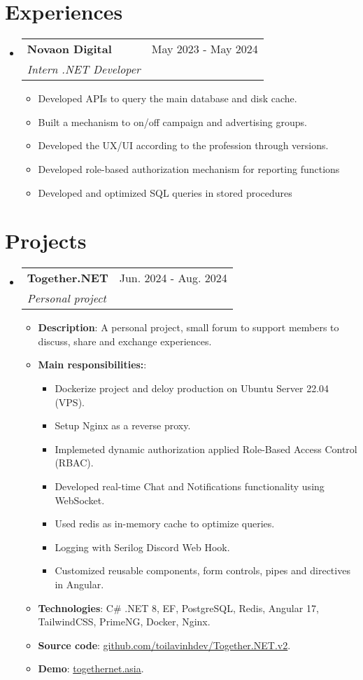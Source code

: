 \documentclass[letterpaper,11pt]{article}
\makeatletter
\newcommand{\resumeItem}[1]{
  \item\small{
    {#1 \vspace{-2pt}}
  }
}
\newcommand{\resumeSubheading}[4]{
  \vspace{-2pt}
  \item
    \begin{tabular*}{0.97\textwidth}[t]{l@{\extracolsep{\fill}}r}
      \textbf{#1} & #2 \\
      \textit{\small#3} & \textit{\small #4} \\
    \end{tabular*}
    \vspace{-7pt}
}
\newcommand{\resumeSubHeadingListStart} {
    \begin{itemize}[leftmargin=0.15in, label={}]
}
\newcommand{\resumeSubHeadingListEnd} {
    \end{itemize}
}
\newcommand{\resumeItemListStart} {
    \begin{itemize}
}
\newcommand{\resumeItemListEnd} {
    \end{itemize} 
    \vspace{-5pt}
}
\makeatother
\begin{document}
    \section{Experiences}
        \resumeSubHeadingListStart
            \resumeSubheading {Novaon Digital} {May 2023 - May 2024} {Intern .NET Developer} {}
            \resumeItemListStart
                \resumeItem{Developed APIs to query the main database and disk cache.}
                \resumeItem{Built a mechanism to on/off campaign and advertising groups.}
                \resumeItem{Developed the UX/UI according to the profession through versions.}
                \resumeItem{Developed role-based authorization mechanism for reporting functions}
                \resumeItem{Developed and optimized SQL queries in stored procedures}
            \resumeItemListEnd
        \resumeSubHeadingListEnd
        
    \section{Projects}
        \resumeSubHeadingListStart
            \resumeSubheading {Together.NET} {Jun. 2024 - Aug. 2024} {Personal project} {}
            \resumeItemListStart
                \resumeItem{\textbf{Description}: A personal project,  small forum to support members to discuss, share and exchange experiences.}
                \resumeItem{\textbf{Main responsibilities:}:}
                \resumeItemListStart
                    \resumeItem{Dockerize project and deloy production on Ubuntu Server 22.04 (VPS).}
                    \resumeItem{Setup Nginx as a reverse proxy.}
                    \resumeItem{Implemeted dynamic authorization applied Role-Based Access Control (RBAC).}
                    \resumeItem{Developed real-time Chat and Notifications functionality using WebSocket.}
                    \resumeItem{Used redis as in-memory cache to optimize queries.}
                    \resumeItem{Logging with Serilog Discord Web Hook.}
                    \resumeItem{Customized reusable components, form controls, pipes and directives in Angular.}
                \resumeItemListEnd
                \vspace{0.2cm}
                \resumeItem{\textbf{Technologies}: C\# .NET 8, EF, PostgreSQL, Redis, Angular 17, TailwindCSS, PrimeNG, Docker, Nginx.}
                \resumeItem{
                    \textbf{Source code}: \href{https://github.com/toilavinhdev/Together.NET.v2}{\underline{github.com/toilavinhdev/Together.NET.v2}}.
                }
                \resumeItem{
                    \textbf{Demo}: \href{https://togethernet.asia}{\underline{togethernet.asia}}.
                }
            \resumeItemListEnd
        \resumeSubHeadingListEnd
\end{document}

